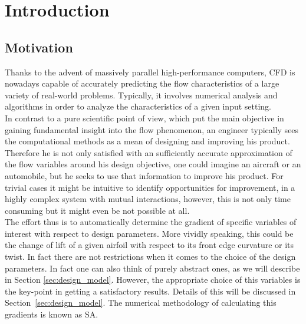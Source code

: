 
\section{Introduction}\label{chapt:introduction}


\subsection{Motivation}\label{sec:motivation}
Thanks to the advent of massively parallel high-performance computers, \ac{CFD} is nowadays capable of accurately predicting the flow characteristics of a large variety of real-world problems.
Typically, it involves numerical analysis and algorithms in order to analyze the characteristics of a given input setting.\\
In contrast to a pure scientific point of view, which put the main objective in gaining fundamental insight into the flow phenomenon, an engineer typically sees the computational methods as a mean of designing and improving his product. Therefore he is not only satisfied with an sufficiently accurate approximation of the flow variables around his design objective, one could imagine an aircraft or an automobile, but he seeks to use that information to improve his product.
For trivial cases it might be intuitive to identify opportunities for improvement, in a highly complex system with mutual interactions, however, this is not only time consuming but it might even be not possible at all.\\

The effort thus is to automatically determine the gradient of specific variables of interest with respect to design parameters. More vividly speaking, this could be the change of lift of a given airfoil with respect to its front edge curvature or its twist. In fact there are not restrictions when it comes to the choice of the design parameters. In fact one can also think of purely abstract ones, as we will describe in Section \ref{sec:design_model}. However, the appropriate choice of this variables is the key-point in getting a satisfactory results. Details of this will be discussed in Section~\ref{sec:design_model}.
The numerical methodology of calculating this gradients is known as \ac{SA}.\\

